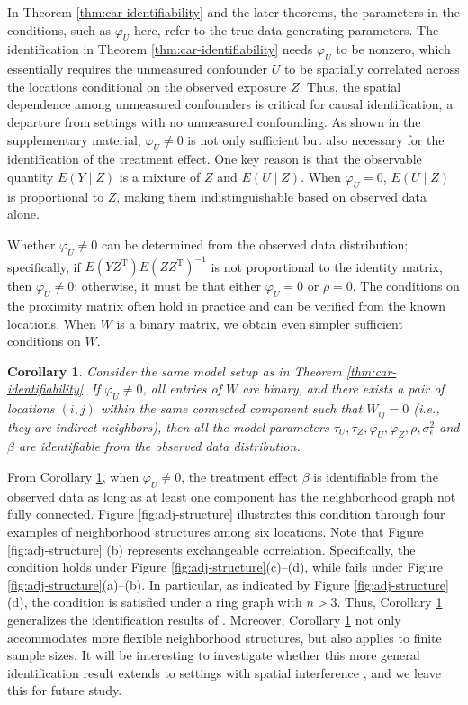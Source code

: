 \documentclass[11pt]{article}
\newtheorem{corollary}{Corollary}
\theoremstyle{definition}
\theoremstyle{remark}
\def\top{{ \mathrm{\scriptscriptstyle T} }}
\begin{document}
In Theorem \ref{thm:car-identifiability} and the later theorems, the parameters in the conditions, such as $\varphi_U$ here, refer to the true data generating parameters. 
The identification in Theorem \ref{thm:car-identifiability} needs $\varphi_U$ to be nonzero, which essentially requires the unmeasured confounder $U$ to be spatially correlated across the locations conditional on the observed exposure $Z$. 
Thus, the spatial dependence among unmeasured confounders is critical for causal identification, a departure from settings with no unmeasured confounding.
As shown in the supplementary material, $\varphi_U\ne 0$ is not only sufficient but also necessary for the identification of the treatment effect. 
One key reason is that the observable quantity $E(Y \mid Z)$ is a mixture of $Z$ and $E(U \mid Z)$. When $\varphi_U = 0$, $E(U\mid Z)$ is proportional to $Z$, making them indistinguishable based on observed data alone. 

Whether $\varphi_U\ne 0$ can be determined from the observed data distribution; 
specifically, if $E(YZ^\top)E(ZZ^\top)^{-1}$ is not proportional to the identity matrix, then $\varphi_U \ne 0$; otherwise, it must be that either $\varphi_U = 0$ or $\rho = 0$. 
The conditions on the proximity matrix often hold in practice and can be verified from the known locations.
When $W$ is a binary matrix, we obtain even simpler sufficient conditions on $W$.

\begin{corollary}\label{cor:car-identifiability-binary}
Consider the same model setup as in Theorem \ref{thm:car-identifiability}. If $\varphi_U
\neq
0$, all entries of $W$ are binary, and 
there exists a pair of locations $(i,j)$ within the same connected component such that $W_{ij}=0$ (i.e., they are indirect neighbors), 
then all the model parameters $\tau_U, \tau_Z, \varphi_U, \varphi_Z, \rho, \sigma_\epsilon^2$ and $\beta$ are identifiable from the observed data distribution.  
\end{corollary}


From Corollary \ref{cor:car-identifiability-binary}, 
when $\varphi_U \neq 0$, the treatment effect $\beta$ is identifiable from the observed data as long as at least one component has the neighborhood graph not fully connected.
Figure \ref{fig:adj-structure} illustrates this condition through four examples of neighborhood structures among six locations. 
Note that Figure \ref{fig:adj-structure} (b) represents exchangeable correlation. 
Specifically, the condition holds under Figure \ref{fig:adj-structure}(c)--(d), while fails under Figure \ref{fig:adj-structure}(a)--(b). 
In particular, as indicated by Figure \ref{fig:adj-structure}(d), 
the condition is satisfied under a ring graph with $n > 3$.
Thus, Corollary \ref{cor:car-identifiability-binary} generalizes the identification results of \citet{schnell2020mitigating}.
Moreover, Corollary \ref{cor:car-identifiability-binary}  not only accommodates more flexible neighborhood structures, but also applies to finite sample sizes. 
It will be interesting to investigate whether this more general identification result extends to settings with spatial interference \citep{papadogeorgou2023spatial}, and we leave this for future study.
\end{document}
